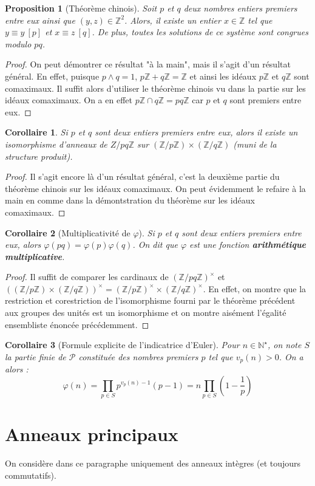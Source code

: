 \documentclass[french]{book}
\newcommand{\N}{\mathbb{N}}
\newcommand{\Z}{\mathbb{Z}}
\newcommand{\st}{^\star}
\theoremstyle{plain}
\newtheorem{prop}{Proposition}[chapter]
\newtheorem{cor}{Corollaire}[chapter]
\theoremstyle{definition}
\theoremstyle{remark}
\begin{document}
\begin{prop}[Théorème chinois]
	Soit $p$ et $q$ deux nombres entiers premiers entre eux ainsi que $(y,z)\in\Z^2$. Alors, il existe un entier $x\in\Z$ tel que $y\equiv y\ [p]$ et $x\equiv z\ [q]$. De plus, toutes les solutions de ce système sont congrues modulo $pq$. 
\end{prop}
\begin{proof}
	On peut démontrer ce résultat "à la main", mais il s'agit d'un résultat général. En effet, puisque $p\wedge q=1$, $p\Z+q\Z=\Z$ et ainsi les idéaux $p\Z$ et $q\Z$ sont comaximaux. Il suffit alors d'utiliser le théorème chinois vu dans la partie sur les idéaux comaximaux. On a en effet $p\Z\cap q\Z=pq\Z$ car $p$ et $q$ sont premiers entre eux.
\end{proof}
\begin{cor}
	Si $p$ et $q$ sont deux entiers premiers entre eux, alors il existe un isomorphisme d'anneaux de $Z/pq\Z$ sur $(\Z/p\Z)\times(\Z/q\Z)$ (muni de la structure produit).
\end{cor}
\begin{proof}
	Il s'agit encore là d'un résultat général, c'est la deuxième partie du théorème chinois sur les idéaux comaximaux. On peut évidemment le refaire à la main en comme dans la démontstration du théorème sur les idéaux comaximaux.
\end{proof}
\begin{cor}[Multiplicativité de $\varphi$]
	Si $p$ et $q$ sont deux entiers premiers entre eux, alors $\varphi(pq)=\varphi(p)\varphi(q)$. On dit que $\varphi$ est une fonction \textbf{arithmétique multiplicative}.
\end{cor}
\begin{proof}
	Il suffit de comparer les cardinaux de $(\Z/pq\Z)^\times$ et $((\Z/p\Z)\times(\Z/q\Z))^\times=(\Z/p\Z)^\times\times(\Z/q\Z)^\times$. En effet, on montre que la restriction et corestriction de l'isomorphisme fourni par le théorème précédent aux groupes des unités est un isomorphisme et on montre aisément l'égalité ensembliste énoncée précédemment.
\end{proof}
\begin{cor}[Formule explicite de l'indicatrice d'Euler]
	Pour $n\in\N\st$, on note $S$ la partie finie de $\mathcal{P}$ constituée des nombres premiers $p$ tel que $v_p(n)>0$. On a alors : $$\varphi(n)=\prod_{p\in S}p^{v_p(n)-1}(p-1)=n\prod_{p\in S}\left(1-\frac{1}{p}\right)$$
\end{cor}
\section{Anneaux principaux}
On considère dans ce paragraphe uniquement des anneaux intègres (et toujours commutatifs).
\end{document}
